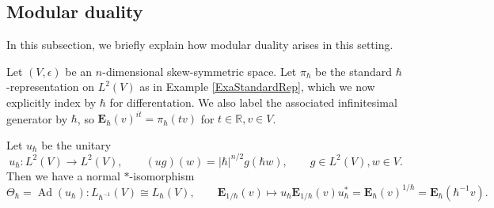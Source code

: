 \documentclass[11pt, reqno]{amsart}
\theoremstyle{definition}
\numberwithin{equation}{section}
\def\Ad{\operatorname{Ad}}
\def\R{\mathbb R}
\newcommand{\eb}{\mathbf{E}}
\begin{document}
\subsection{Modular duality}
 

In this subsection, we briefly explain how modular duality arises in this setting. 

Let $(V,\epsilon)$ be an $n$-dimensional skew-symmetric space. Let $\pi_{\hbar}$ be the standard $\hbar$-representation on $L^2(V)$ as in Example \ref{ExaStandardRep}, which we now explicitly index by $\hbar$ for differentation. We also label the associated infinitesimal generator by $\hbar$, so $\eb_{\hbar}(v)^{it} = \pi_{\hbar}(tv)$ for $t\in \R,v\in V$. 

Let $u_{\hbar}$ be the unitary 
\[
u_{\hbar} \colon L^2(V) \rightarrow L^2(V),\qquad (ug)(w) = |\hbar|^{n/2}g(\hbar w) ,\qquad g\in L^2(V),w\in V. 
\]
Then we have a normal $*$-isomorphism 
\begin{equation}\label{EqIsohbarhinvbar}
\Theta_{\hbar} = \Ad(u_{\hbar})\colon L_{\hbar^{-1}}(V) \cong L_{\hbar}(V),\qquad \eb_{1/\hbar}(v) \mapsto u_{\hbar}\eb_{1/\hbar}(v)u_{\hbar}^* = \eb_{\hbar}(v)^{1/\hbar} = \eb_{\hbar}(\hbar^{-1}v).
\end{equation}
\end{document}
